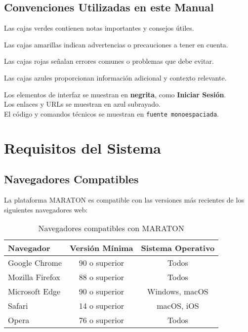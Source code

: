 \documentclass[11pt,a4paper,twoside]{book}
\begin{document}
\section{Convenciones Utilizadas en este Manual}

\begin{notebox}
Las cajas verdes contienen notas importantes y consejos útiles.
\end{notebox}

\begin{warningbox}
Las cajas amarillas indican advertencias o precauciones a tener en cuenta.
\end{warningbox}

\begin{errorbox}
Las cajas rojas señalan errores comunes o problemas que debe evitar.
\end{errorbox}

\begin{infobox}
Las cajas azules proporcionan información adicional y contexto relevante.
\end{infobox}

\noindent
Los elementos de interfaz se muestran en \textbf{negrita}, como \textbf{Iniciar Sesión}.\\
Los enlaces y URLs se muestran en \textcolor{maratonblue}{azul subrayado}.\\
El código y comandos técnicos se muestran en \texttt{fuente monoespaciada}.

\chapter{Requisitos del Sistema}

\section{Navegadores Compatibles}

La plataforma MARATON es compatible con las versiones más recientes de los siguientes navegadores web:

\begin{table}[h]
\centering
\begin{tabular}{@{}lcc@{}}
\toprule
\textbf{Navegador} & \textbf{Versión Mínima} & \textbf{Sistema Operativo} \\ \midrule
Google Chrome      & 90 o superior           & Todos                      \\
Mozilla Firefox    & 88 o superior           & Todos                      \\
Microsoft Edge     & 90 o superior           & Windows, macOS             \\
Safari             & 14 o superior           & macOS, iOS                 \\
Opera              & 76 o superior           & Todos                      \\ \bottomrule
\end{tabular}
\caption{Navegadores compatibles con MARATON}
\end{table}
\end{document}
